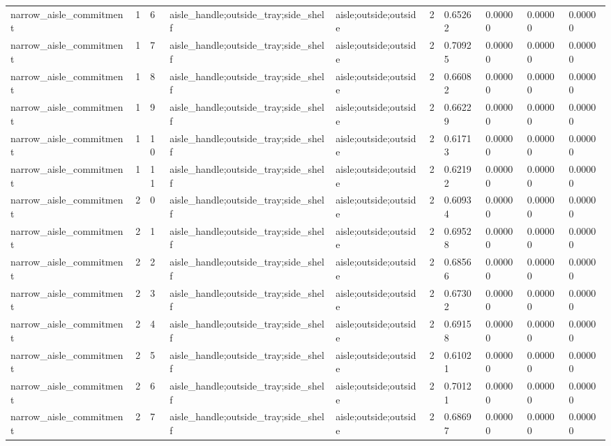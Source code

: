 \documentclass{article}
\begin{document}
\begin{table}[tbp]
{\begin{tabular}{llllllllll}
narrow\_aisle\_commitment & 1 & 6 & aisle\_handle;outside\_tray;side\_shelf & aisle;outside;outside & 2 & 0.65262 & 0.00000 & 0.00000 & 0.00000 \\
narrow\_aisle\_commitment & 1 & 7 & aisle\_handle;outside\_tray;side\_shelf & aisle;outside;outside & 2 & 0.70925 & 0.00000 & 0.00000 & 0.00000 \\
narrow\_aisle\_commitment & 1 & 8 & aisle\_handle;outside\_tray;side\_shelf & aisle;outside;outside & 2 & 0.66082 & 0.00000 & 0.00000 & 0.00000 \\
narrow\_aisle\_commitment & 1 & 9 & aisle\_handle;outside\_tray;side\_shelf & aisle;outside;outside & 2 & 0.66229 & 0.00000 & 0.00000 & 0.00000 \\
narrow\_aisle\_commitment & 1 & 10 & aisle\_handle;outside\_tray;side\_shelf & aisle;outside;outside & 2 & 0.61713 & 0.00000 & 0.00000 & 0.00000 \\
narrow\_aisle\_commitment & 1 & 11 & aisle\_handle;outside\_tray;side\_shelf & aisle;outside;outside & 2 & 0.62192 & 0.00000 & 0.00000 & 0.00000 \\
narrow\_aisle\_commitment & 2 & 0 & aisle\_handle;outside\_tray;side\_shelf & aisle;outside;outside & 2 & 0.60934 & 0.00000 & 0.00000 & 0.00000 \\
narrow\_aisle\_commitment & 2 & 1 & aisle\_handle;outside\_tray;side\_shelf & aisle;outside;outside & 2 & 0.69528 & 0.00000 & 0.00000 & 0.00000 \\
narrow\_aisle\_commitment & 2 & 2 & aisle\_handle;outside\_tray;side\_shelf & aisle;outside;outside & 2 & 0.68566 & 0.00000 & 0.00000 & 0.00000 \\
narrow\_aisle\_commitment & 2 & 3 & aisle\_handle;outside\_tray;side\_shelf & aisle;outside;outside & 2 & 0.67302 & 0.00000 & 0.00000 & 0.00000 \\
narrow\_aisle\_commitment & 2 & 4 & aisle\_handle;outside\_tray;side\_shelf & aisle;outside;outside & 2 & 0.69158 & 0.00000 & 0.00000 & 0.00000 \\
narrow\_aisle\_commitment & 2 & 5 & aisle\_handle;outside\_tray;side\_shelf & aisle;outside;outside & 2 & 0.61021 & 0.00000 & 0.00000 & 0.00000 \\
narrow\_aisle\_commitment & 2 & 6 & aisle\_handle;outside\_tray;side\_shelf & aisle;outside;outside & 2 & 0.70121 & 0.00000 & 0.00000 & 0.00000 \\
narrow\_aisle\_commitment & 2 & 7 & aisle\_handle;outside\_tray;side\_shelf & aisle;outside;outside & 2 & 0.68697 & 0.00000 & 0.00000 & 0.00000 \\

\end{tabular}}
\end{table}
\end{document}
